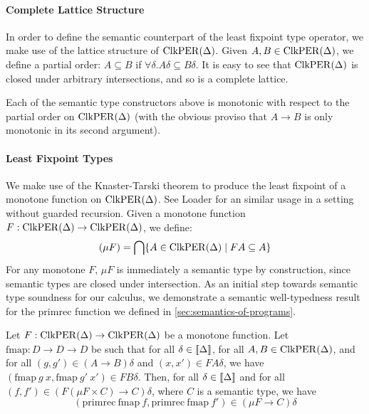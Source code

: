 \paragraph{Complete Lattice Structure} In order to define the semantic
counterpart of the least fixpoint type operator, we make use of the
lattice structure of $\mathrm{ClkPER}(\Delta)$. Given $A, B \in
\mathrm{ClkPER}(\Delta)$, we define a partial order: $A \subseteq B$ if
$\forall \delta. A\delta \subseteq B\delta$. It is easy to see that
$\mathrm{ClkPER}(\Delta)$ is closed under arbitrary intersections, and so is a
complete lattice.

Each of the semantic type constructors above is monotonic with respect
to the partial order on $\mathrm{ClkPER}(\Delta)$ (with the obvious proviso
that $A \to B$ is only monotonic in its second argument).

\paragraph{Least Fixpoint Types}
We make use of the Knaster-Tarski theorem \cite{tarski55lattice} to
produce the least fixpoint of a monotone function on
$\mathrm{ClkPER}(\Delta)$. See Loader \cite{loader97equational} for an similar
usage in a setting without guarded recursion. Given a monotone
function $F : \mathrm{ClkPER}(\Delta) \to \mathrm{ClkPER}(\Delta)$, we define:
\begin{displaymath}
  (\mu F) = \bigcap \{ A \in \mathrm{ClkPER}(\Delta) \mathrel| FA \subseteq A \}
\end{displaymath}
For any monotone $F$, $\mu F$ is immediately a semantic type by
construction, since semantic types are closed under intersection. As
an initial step towards semantic type soundness for our calculus, we
demonstrate a semantic well-typedness result for the
$\mathrm{primrec}$ function we defined in
\autoref{sec:semantics-of-programs}.

\begin{lemma}\label{lem:primrec-well-typed}
  Let $F : \mathrm{ClkPER}(\Delta) \to \mathrm{ClkPER}(\Delta)$ be a monotone
  function.  Let $\mathrm{fmap} : D \to D \to D$ be such that for all
  $\delta \in \llbracket \Delta \rrbracket$, for all $A,B \in \mathrm{ClkPER}(\Delta)$, and
  for all $(g,g') \in (A \to B)\delta$ and $(x,x') \in FA\delta$, we
  have $(\mathrm{fmap}\ g\ x, \mathrm{fmap}\ g'\ x') \in FB\delta$.
  Then, for all $\delta \in \llbracket \Delta \rrbracket$ and for all $(f,f') \in
  (F(\mu F \times C) \to C)\delta$, where $C$ is a semantic type, we
  have
  \begin{displaymath}
    (\mathrm{primrec}\ \mathrm{fmap}\ f, \mathrm{primrec}\ \mathrm{fmap}\ f') \in (\mu F \to C)\delta
  \end{displaymath}
\end{lemma}

